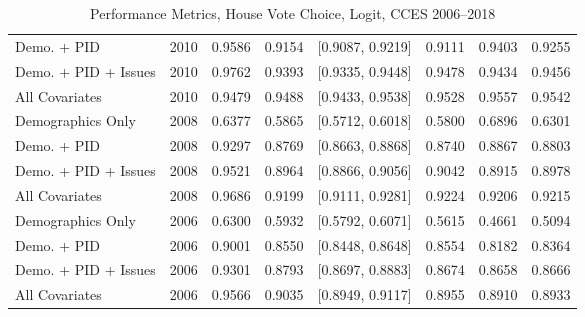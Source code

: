 \begin{table}[ht]
\begin{tabular}{lrrrlrrr}
  Demo. + PID & 2010 & 0.9586 & 0.9154 & [0.9087, 0.9219] & 0.9111 & 0.9403 & 0.9255 \\ 
  Demo. + PID + Issues & 2010 & 0.9762 & 0.9393 & [0.9335, 0.9448] & 0.9478 & 0.9434 & 0.9456 \\ 
  All Covariates & 2010 & 0.9479 & 0.9488 & [0.9433, 0.9538] & 0.9528 & 0.9557 & 0.9542 \\ 
  Demographics Only & 2008 & 0.6377 & 0.5865 & [0.5712, 0.6018] & 0.5800 & 0.6896 & 0.6301 \\ 
  Demo. + PID & 2008 & 0.9297 & 0.8769 & [0.8663, 0.8868] & 0.8740 & 0.8867 & 0.8803 \\ 
  Demo. + PID + Issues & 2008 & 0.9521 & 0.8964 & [0.8866, 0.9056] & 0.9042 & 0.8915 & 0.8978 \\ 
  All Covariates & 2008 & 0.9686 & 0.9199 & [0.9111, 0.9281] & 0.9224 & 0.9206 & 0.9215 \\ 
  Demographics Only & 2006 & 0.6300 & 0.5932 & [0.5792, 0.6071] & 0.5615 & 0.4661 & 0.5094 \\ 
  Demo. + PID & 2006 & 0.9001 & 0.8550 & [0.8448, 0.8648] & 0.8554 & 0.8182 & 0.8364 \\ 
  Demo. + PID + Issues & 2006 & 0.9301 & 0.8793 & [0.8697, 0.8883] & 0.8674 & 0.8658 & 0.8666 \\ 
  All Covariates & 2006 & 0.9566 & 0.9035 & [0.8949, 0.9117] & 0.8955 & 0.8910 & 0.8933 \\ 
   \bottomrule
\end{tabular}
\caption{Performance Metrics, House Vote Choice, Logit, CCES 2006--2018} 
\label{tab:cces_house_logit}
\end{table}
